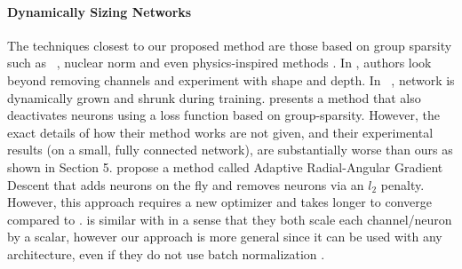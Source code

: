 \paragraph{Dynamically Sizing Networks}The techniques closest to our
proposed method are those based on group sparsity such as
~\cite{Scardapane2017,Alvarez2016a}, nuclear norm \cite{Alvarez2017a} and even
physics-inspired methods \cite{Wen2017}. In \cite{Wen2016}, authors look beyond
removing channels and experiment with shape and depth. In ~\cite{Philipp},
network is dynamically grown and shrunk during training.  \cite{Scardapane2017}
presents a method that also deactivates neurons using a loss function based on
group-sparsity.  However, the exact details of how their method works are not
given, and their experimental results (on a small, fully connected network), are
substantially worse than ours as shown in Section 5.  \cite{Philipp} propose a
method called Adaptive Radial-Angular Gradient Descent that adds neurons on the
fly and removes neurons via an $l_2$ penalty.  However, this approach requires a
new optimizer and takes longer to converge compared to \shrink.
\cite{Liu} is similar with \shrink in a sense that they both scale each
channel/neuron by a scalar, however our approach is more general since it can be
used with any architecture, even if they do not use batch normalization
.

